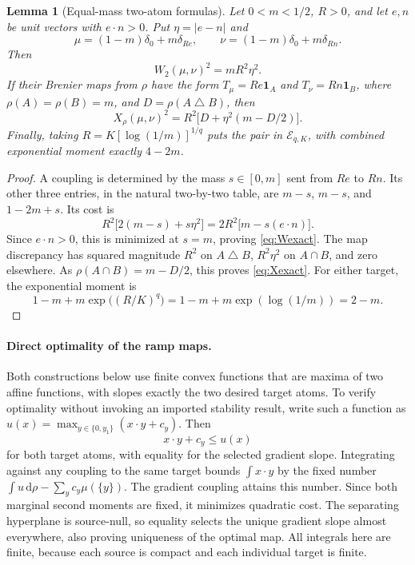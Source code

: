 \documentclass[11pt]{article}
\newtheorem{lemma}[theorem]{Lemma}
\theoremstyle{remark}\newtheorem{remark}[theorem]{Remark}
\newcommand{\ind}{\mathbf 1}
\newcommand{\dd}{\,\mathrm d}
\begin{document}
\begin{lemma}[Equal-mass two-atom formulas]\label{lem:atoms}
Let $0<m<1/2$, $R>0$, and let $e,n$ be unit vectors with
$e\cdot n>0$. Put $\eta=|e-n|$ and
\[
 \mu=(1-m)\delta_0+m\delta_{Re},\qquad
 \nu=(1-m)\delta_0+m\delta_{Rn}.
\]
Then
\begin{equation}\label{eq:Wexact}
 W_2(\mu,\nu)^2=mR^2\eta^2.
\end{equation}
If their Brenier maps from $\rho$ have the form
$T_\mu=Re\ind_A$ and $T_\nu=Rn\ind_B$, where
$\rho(A)=\rho(B)=m$, and $D=\rho(A\mathbin\triangle B)$, then
\begin{equation}\label{eq:Xexact}
 X_\rho(\mu,\nu)^2
 =R^2\bigl[D+\eta^2(m-D/2)\bigr].
\end{equation}
Finally, taking $R=K[\log(1/m)]^{1/q}$ puts the pair in
$\mathcal E_{q,K}$, with combined exponential moment exactly $4-2m$.
\end{lemma}
\begin{proof}
A coupling is determined by the mass $s\in[0,m]$ sent from $Re$ to
$Rn$. Its other three entries, in the natural two-by-two table, are
$m-s$, $m-s$, and $1-2m+s$. Its cost is
\[
 R^2\bigl[2(m-s)+s\eta^2\bigr]
 =2R^2\bigl[m-s(e\cdot n)\bigr].
\]
Since $e\cdot n>0$, this is minimized at $s=m$, proving
\eqref{eq:Wexact}. The map discrepancy has squared magnitude $R^2$
on $A\mathbin\triangle B$, $R^2\eta^2$ on $A\cap B$, and zero
elsewhere. As $\rho(A\cap B)=m-D/2$, this proves
\eqref{eq:Xexact}. For either target, the exponential moment is
\[
 1-m+m\exp\bigl((R/K)^q\bigr)
 =1-m+m\exp(\log(1/m))=2-m.
\]
\end{proof}

\paragraph{Direct optimality of the ramp maps.}
Both constructions below use finite convex functions that are maxima
of two affine functions, with slopes exactly the two desired target
atoms. To verify optimality without invoking an imported stability
result, write such a function as
$u(x)=\max_{y\in\{0,y_1\}}(x\cdot y+c_y)$. Then
\[
 x\cdot y+c_y\le u(x)
\]
for both target atoms, with equality for the selected gradient slope.
Integrating against any coupling to the same target bounds
$\int x\cdot y$ by the fixed number
$\int u\dd\rho-\sum_y c_y\mu(\{y\})$. The gradient coupling attains
this number. Since both marginal second moments are fixed, it
minimizes quadratic cost. The separating hyperplane is source-null,
so equality selects the unique gradient slope almost everywhere,
also proving uniqueness of the optimal map. All integrals here are
finite, because each source is compact and each individual target
is finite.
\end{document}
